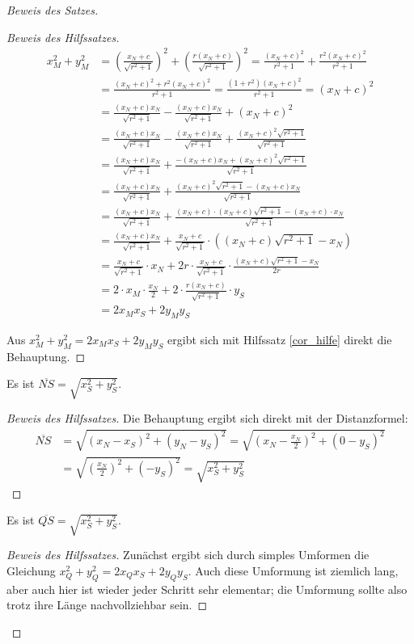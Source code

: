 \begin{proof}[Beweis des Satzes]
\begin{proof}[Beweis des Hilfssatzes]
        \begin{align*}
            x_M^2+y_M^2&=\left(\frac{x_N+c}{\sqrt{r^2+1}}\right)^2+\left(\frac{r(x_N+c)}{\sqrt{r^2+1}}\right)^2
            =\frac{(x_N+c)^2}{r^2+1}+\frac{r^2(x_N+c)^2}{r^2+1}\\
            &=\frac{(x_N+c)^2+r^2(x_N+c)^2}{r^2+1}=\frac{(1+r^2)(x_N+c)^2}{r^2+1}=(x_N+c)^2\\
            &=\frac{(x_N+c)x_N}{\sqrt{r^2+1}}-\frac{(x_N+c)x_N}{\sqrt{r^2+1}}+(x_N+c)^2\\
            &=\frac{(x_N+c)x_N}{\sqrt{r^2+1}}-\frac{(x_N+c)x_N}{\sqrt{r^2+1}}+\frac{(x_N+c)^2\sqrt{r^2+1}}{\sqrt{r^2+1}}\\
            &=\frac{(x_N+c)x_N}{\sqrt{r^2+1}}+\frac{-(x_N+c)x_N+(x_N+c)^2\sqrt{r^2+1}}{\sqrt{r^2+1}}\\
            &=\frac{(x_N+c)x_N}{\sqrt{r^2+1}}+\frac{(x_N+c)^2\sqrt{r^2+1}-(x_N+c)x_N}{\sqrt{r^2+1}}\\
            &=\frac{(x_N+c)x_N}{\sqrt{r^2+1}}+\frac{(x_N+c)\cdot(x_N+c)\sqrt{r^2+1}-(x_N+c)\cdot x_N}{\sqrt{r^2+1}}\\
            &=\frac{(x_N+c)x_N}{\sqrt{r^2+1}}+\frac{x_N+c}{\sqrt{r^2+1}}\cdot \left((x_N+c)\sqrt{r^2+1}-x_N\right)\\
            &=\frac{x_N+c}{\sqrt{r^2+1}}\cdot x_N+2r\cdot\frac{x_N+c}{\sqrt{r^2+1}}\cdot\frac{(x_N+c)\sqrt{r^2+1}-x_N}{2r}\\
            &=2\cdot x_M\cdot\frac{x_N}{2}+2\cdot\frac{r(x_N+c)}{\sqrt{r^2+1}}\cdot y_S\\
            &=2x_Mx_S+2y_My_S
        \end{align*}

        Aus $x_M^2+y_M^2=2x_Mx_S+2y_My_S$ ergibt sich mit Hilfssatz \ref{cor_hilfe} direkt die Behauptung.
    \end{proof}
    \begin{lem}\label{dumm_N}
        Es ist $\overline{NS}=\sqrt{x_S^2+y_S^2}$.
    \end{lem}
    \begin{proof}[Beweis des Hilfssatzes]
        Die Behauptung ergibt sich direkt mit der Distanzformel:
        \begin{align*}
            \overline{NS}&=\sqrt{(x_N-x_S)^2+(y_N-y_S)^2}=\sqrt{\left(x_N-\frac{x_N}{2}\right)^2+(0-y_S)^2}\\
            &=\sqrt{\left(\frac{x_N}{2}\right)^2+(-y_S)^2}=\sqrt{x_S^2+y_S^2}
        \end{align*}
    \end{proof}
    \begin{lem}\label{dumm_Q}
        Es ist $\overline{QS}=\sqrt{x_S^2+y_S^2}$.
    \end{lem}
    \begin{proof}[Beweis des Hilfssatzes]
        Zunächst ergibt sich durch simples Umformen die Gleichung $x_Q^2+y_Q^2=2x_Qx_S+2y_Qy_S$. Auch diese 
        Umformung ist ziemlich lang, aber auch hier ist wieder jeder Schritt sehr elementar; die Umformung sollte 
        also trotz ihre Länge nachvollziehbar sein.


\end{proof}
\end{proof}
